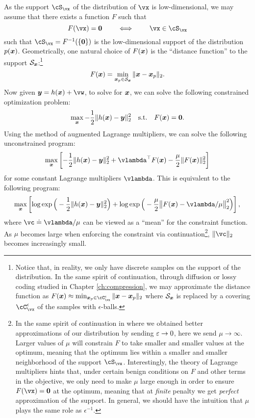 \documentclass[../../book-main.tex]{subfiles}
\begin{document}
As the support \(\cS_{\vx}\) of the distribution of \(\vx\) is low-dimensional, we may assume that there exists a function \(F\) such that
\begin{equation}
  F(\vx) = \boldsymbol{0} \qquad \iff \qquad \vx \in \cS_{\vx}
\end{equation}
such that \(\cS_{\vx} = F^{-1}(\{\vzero\})\) is the low-dimensional support of the distribution $p(\bm{x})$. Geometrically, one natural choice of $F(\bm{x})$ is the ``distance function'' to the support $\mathcal{S}_{\bm{x}}$:\footnote{Notice that, in reality, we only have discrete samples on the support of the distribution. In the same spirit of continuation, through diffusion or lossy coding studied in Chapter \ref{ch:compression}, we may approximate the distance function as $F(\x) \approx \min_{\x_p \in \cC_{\vx}^{\epsilon}} \|\x - \x_p\|_2$ where $\mathcal{S}_{\bm{x}}$ is replaced by a covering \(\cC_{\vx}^{\epsilon}\) of the samples with $\epsilon$-balls. }
\begin{equation}
    F(\bm{x}) = \min_{\bm{x}_p \in \mathcal{S}_{\bm{x}}} \|\bm{x} - \bm{x}_p\|_2. 
\end{equation}
Now given $\y = h(\x) +\vw$, to solve for $\bm{x}$, we can solve the following constrained optimization problem:
\begin{equation}
    \max_{\bm{x}} - \frac{1}{2}\|h(\bm{x}) - \bm{y}\|_2^2 \quad \mbox{s.t.} \quad F(\bm{x}) = \boldsymbol{0}. 
\end{equation}
Using the method of augmented Lagrange multipliers, we can solve the following unconstrained program:
\begin{equation}
   \max_{\x} \left[-\frac{1}{2}\|h(\x) - \y\|_2^2  + \vlambda^{\top} F(\x) - \frac{\mu}{2} \|F(\x)\|_2^2\right]
\end{equation}
for some constant Lagrange multipliers $\vlambda$.
This is equivalent to the following program:
\begin{equation}\label{eq:lagrange_multiplier_continuation}
\max_{\x} \left[\log \exp\Big(- \frac{1}{2}\|h(\x) - \y\|_2^2\Big) + \log \exp\Big( - \frac{\mu}{2} \big\|F(\x) - \vlambda/\mu\big\|_2^2\Big)\right],
\end{equation} 
where $\vc \doteq {\vlambda}/{\mu}$ can be viewed as a ``mean''  for the constraint function. As $\mu$ becomes large when enforcing the constraint via continuation\footnote{In the same spirit of continuation in  where we obtained better approximations of our distribution by sending \(\varepsilon \to 0\), here we send \(\mu \to \infty\). Larger values of \(\mu\) will constrain \(F\) to take smaller and smaller values at the optimum, meaning that the optimum lies within a smaller and smaller neighborhood of the support \(\cS_{\vx}\). Interestingly, the theory of Lagrange multipliers hints that, under certain benign conditions on \(F\) and other terms in the objective, we only need to make \(\mu\) large enough in order to ensure \(F(\vx) = \vzero\) at the optimum, meaning that at \textit{finite} penalty we get \textit{perfect} approximation of the support. In general, we should have the intuition that \(\mu\) plays the same role as  \(\epsilon^{-1}\).}, $\|\vc\|_2$ becomes increasingly small.
\end{document}

